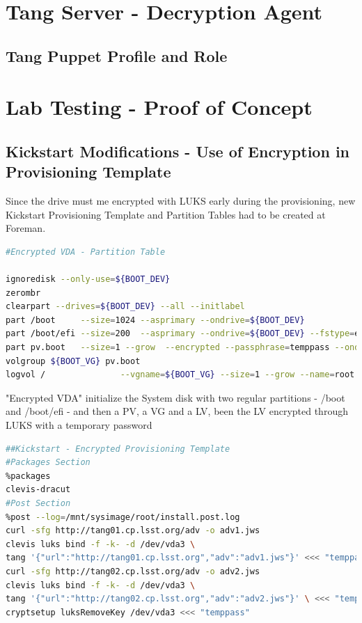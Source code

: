 \section{Tang Server - Decryption Agent}

\subsection{Tang Puppet Profile and Role}

\newpage
\section{Lab Testing - Proof of Concept}
\subsection{Kickstart Modifications - Use of Encryption in Provisioning Template}
Since the drive must me encrypted with LUKS early during the provisioning, new Kickstart Provisioning Template and Partition Tables had to be created at Foreman.

\vskip 0.5cm
\begin{lstlisting}[language=bash]
#Encrypted VDA - Partition Table

ignoredisk --only-use=${BOOT_DEV}
zerombr
clearpart --drives=${BOOT_DEV} --all --initlabel
part /boot     --size=1024 --asprimary --ondrive=${BOOT_DEV}
part /boot/efi --size=200  --asprimary --ondrive=${BOOT_DEV} --fstype=efi
part pv.boot   --size=1 --grow  --encrypted --passphrase=temppass --ondisk=${BOOT_DEV}
volgroup ${BOOT_VG} pv.boot
logvol /               --vgname=${BOOT_VG} --size=1 --grow --name=root
\end{lstlisting}

"Encrypted VDA" initialize the System disk with two regular partitions - /boot and /boot/efi - and then a PV, a VG and a LV, been the LV encrypted through LUKS with a temporary password
\vskip 0.5cm
\begin{lstlisting}[language=bash]
##Kickstart - Encrypted Provisioning Template
#Packages Section
%packages
clevis-dracut
#Post Section
%post --log=/mnt/sysimage/root/install.post.log
curl -sfg http://tang01.cp.lsst.org/adv -o adv1.jws
clevis luks bind -f -k- -d /dev/vda3 \
tang '{"url":"http://tang01.cp.lsst.org","adv":"adv1.jws"}' <<< "temppass"
curl -sfg http://tang02.cp.lsst.org/adv -o adv2.jws
clevis luks bind -f -k- -d /dev/vda3 \
tang '{"url":"http://tang02.cp.lsst.org","adv":"adv2.jws"}' \ <<< "temppass"
cryptsetup luksRemoveKey /dev/vda3 <<< "temppass"
\end{lstlisting}

